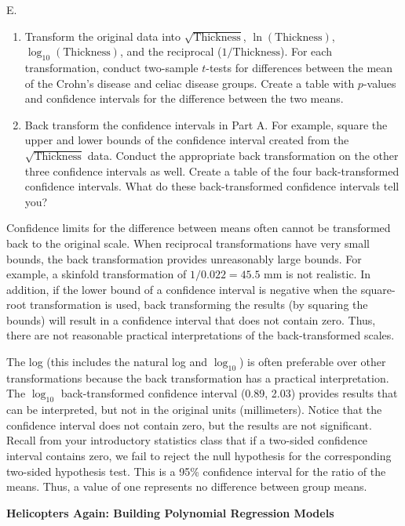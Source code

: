 \documentclass[
]{report}
\newcounter{excount}
\renewcommand{\theexcount}{E\arabic{excount}}
\begin{document}
\begin{list}{\theexcount.}{ \setlength{\itemsep}{1.2em}}
    \begin{enumerate}
      \item Transform the original data into $\sqrt{\text{Thickness}}$, $\ln(\text{Thickness})$, $\log_{10}(\text{Thickness})$, and the reciprocal ($1/\text{Thickness}$). For each transformation, conduct two-sample $t$-tests for differences between the mean of the Crohn’s disease and celiac disease groups. Create a table with $p$-values and confidence intervals for the difference between the two means.
      \item Back transform the confidence intervals in Part A. For example, square the upper and lower bounds of the confidence interval created from the $\sqrt{\text{Thickness}}$ data. Conduct the appropriate back transformation on the other three confidence intervals as well. Create a table of the four back-transformed confidence intervals. What do these back-transformed confidence intervals tell you?
    \end{enumerate}

Confidence limits for the difference between means often cannot be transformed back to the original scale. When reciprocal transformations have very small bounds, the back transformation provides unreasonably large bounds. For example, a skinfold transformation of $1/0.022 = 45.5$ mm is not realistic. In addition, if the lower bound of a confidence interval is negative when the square-root transformation is used, back transforming the results (by squaring the bounds) will result in a confidence interval that does not contain zero. Thus, there are not reasonable practical interpretations of the back-transformed scales.

The log (this includes the natural log and $\log_{10}$) is often preferable over other transformations because the back transformation has a practical interpretation. The $\log_{10}$ back-transformed confidence interval (0.89, 2.03) provides results that can be interpreted, but not in the original units (millimeters). Notice that the confidence interval does not contain zero, but the results are not significant. Recall from your introductory statistics class that if a two-sided confidence interval contains zero, we fail to reject the null hypothesis for the corresponding two-sided hypothesis test. This is a 95\% confidence interval for the ratio of the means. Thus, a value of one represents no difference between group means.

  \item \textbf{Helicopters Again: Building Polynomial Regression Models}


\end{list}
\end{document}
